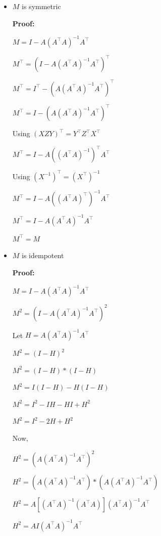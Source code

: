 \documentclass[11pt]{scrartcl}
\begin{document}
	\begin{itemize}
		\item $M$ is symmetric
		
		\textbf{Proof:}
		
		$M = I - A (A^\intercal A)^{-1} A^\intercal$
		
		$M^\intercal = \left(I - A (A^\intercal A)^{-1} A^\intercal\right)^\intercal$
		
		$M^\intercal = I^\intercal - \left(A (A^\intercal A)^{-1} A^\intercal\right)^\intercal$
		
		$M^\intercal = I - \left(A (A^\intercal A)^{-1} A^\intercal\right)^\intercal$
		
		Using $(XZY)^\intercal=Y^\intercal Z^\intercal X^\intercal$
		
		$M^\intercal = I - A \left((A^\intercal A)^{-1}\right)^\intercal A^\intercal$
		
		Using $(X^{-1})^\intercal = (X^\intercal)^{-1}$
		
		$M^\intercal = I - A \left((A^\intercal A)^\intercal\right)^{-1} A^\intercal$
		
		$M^\intercal = I - A (A^\intercal A)^{-1} A^\intercal$
		
		$M^\intercal = M$
		
		\item $M$ is idempotent
		
		\textbf{Proof:}
		
		$M = I - A (A^\intercal A)^{-1} A^\intercal$
		
		$M^2 = \left(I - A (A^\intercal A)^{-1} A^\intercal\right)^2$
		
		Let $H = A (A^\intercal A)^{-1} A^\intercal$
		
		$M^2 = \left(I - H\right)^2$
		
		$M^2 = \left(I - H\right) * \left(I - H\right)$
		
		$M^2 = I\left(I - H\right) - H\left(I - H\right)$
		
		$M^2 = I^2 - IH - HI + H^2$
		
		$M^2 = I^2 - 2H + H^2$
		
		Now, 
		
		$H^2 = \left(A (A^\intercal A)^{-1} A^\intercal\right)^2$
		
		$H^2 = \left(A (A^\intercal A)^{-1} A^\intercal\right) * \left(A (A^\intercal A)^{-1} A^\intercal\right)$
		
		$H^2 = A [(A^\intercal A)^{-1} (A^\intercal A)] (A^\intercal A)^{-1} A^\intercal $
		
		$H^2 = A I (A^\intercal A)^{-1} A^\intercal $
		

\end{itemize}
\end{document}

